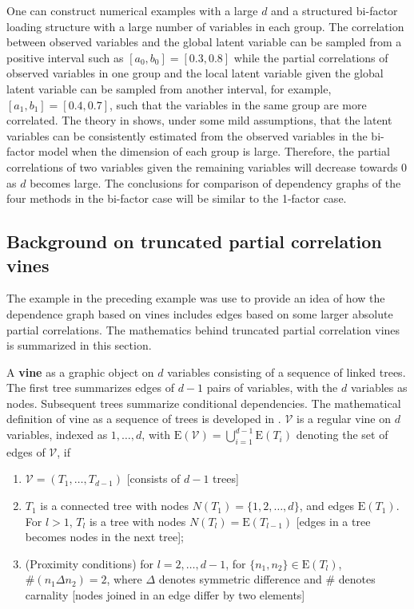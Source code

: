 \documentclass[a4paper]{article}
\def\v{\mathcal{V}}
\def\e{{\mathrm{E}}}
\begin{document}
One can construct numerical examples with a large $d$ and a structured
bi-factor loading structure with a large number of variables in each
group.  The correlation between observed variables and the global
latent variable can be sampled from a positive interval such as
$[a_{0},b_{0}]=[0.3,0.8]$ while the partial correlations of observed
variables in one group and the local latent variable given the global
latent variable can be sampled from another interval, for example,
$[a_1,b_1]=[0.4,0.7]$, such that the variables in the same group are
more correlated.  The theory in \cite{fan2022high} shows, under some
mild assumptions, that the latent variables can be consistently
estimated from the observed variables in the bi-factor model when the
dimension of each group is large.  Therefore, the partial correlations
of two variables given the remaining variables will decrease towards 0
as $d$ becomes large.  The conclusions for comparison of dependency
graphs of the four methods in the bi-factor case will be similar to
the 1-factor case.


\subsection{Background on truncated partial correlation vines}
\label{sec-vine-concept}
The example in the preceding example was use to provide an idea of how the dependence graph
based on vines includes edges based on some larger absolute partial correlations. The mathematics
behind truncated partial correlation vines is summarized in this section.

A \textbf{vine} as a graphic object on $d$ variables consisting of a sequence of linked trees. The first tree summarizes edges of $d-1$ pairs of variables, with the $d$ variables as nodes. Subsequent trees summarize conditional dependencies. The mathematical definition of vine as a sequence of trees is developed in \cite{bedford2002vines}.
$\v$ is a regular vine on $d$ variables, indexed as $1,\ldots,d$, with $\e(\v)=\bigcup_{i=1}^{d-1}\e(T_{i})$ denoting the set of edges of $\v$, if 
\begin{enumerate}
    \item $\v=(T_1,\ldots,T_{d-1})$ [consists of $d-1$ trees]
    \item $T_1$ is a connected tree with nodes $N(T_1)=\{1,2,\ldots,d\}$, and edges $\e(T_1)$. For $l>1$, $T_{l}$ is a tree with nodes $N(T_{l})=\e(T_{l-1})$ [edges in a tree becomes nodes in the next tree];
    \item (Proximity conditions) for $l=2,\ldots,d-1$, for $\{n_1,n_2\}\in \e(T_{l})$, $\#(n_1\Delta n_{2})=2$, where $\Delta$ denotes symmetric difference and $\#$ denotes carnality [nodes joined in an edge differ by two elements]
\end{enumerate}
\end{document}

